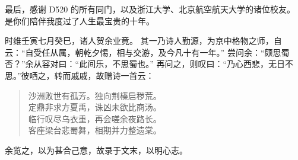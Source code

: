 最后，感谢 D520 的所有同门，以及浙江大学、北京航空航天大学的诸位校友。
是你们陪伴我度过了人生最宝贵的十年。

时维壬寅七月癸巳，诸人贺余业竟。
其一乃诗人勤源，为京中格物之师，自云：“自受任从属，朝乾夕惕，相与交游，及今凡十有一年。”
尝问余：“颇思蜀否？”余从容对曰：“此间乐，不思蜀也。”
再问之，则叹曰：“乃心西悲，无日不思。”彼哂之，转而戚戚，故赠诗一首云：
\begin{quote}
\centering{}
沙洲败世有孤芳。独向荆榛启秽荒。\\
定鼎非求方夏禹，诛凶未欲比商汤。\\
临行叹尽乌衣重，再会嗟余夜路长。\\
客座梁台悲蜀舞，相期并力整遗棠。\\
\end{quote}
余览之，以为甚合己意，故录于文末，以明心志。

